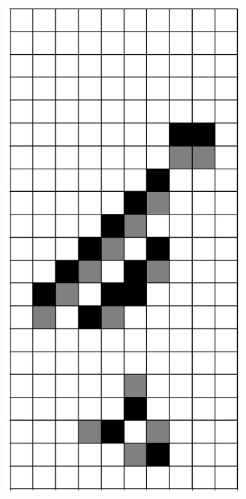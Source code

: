 \documentclass[12pt]{article}
\numberwithin{figure}{section} %
\begin{document}
\begin{figure}[H]
\begin{subfigure}{0.3\textwidth}
     \subcaption{}
   \end{subfigure}
     \begin{subfigure}{0.3\textwidth}
     \centering
     \includegraphics[angle=270,width=\linewidth]{Section4/23.4}

\end{subfigure}
\end{figure}
\end{document}
